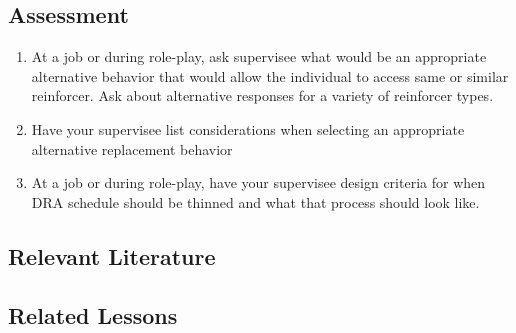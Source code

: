 \subsection{Assessment}
\begin{enumerate}
\item At a job or during role-play, ask supervisee what would be an appropriate alternative behavior that would allow the individual to access same or similar reinforcer. Ask about alternative responses for a variety of reinforcer types.
\item Have your supervisee list considerations when selecting an appropriate alternative replacement behavior
\item At a job or during role-play, have your supervisee design criteria for when DRA schedule should be thinned and what that process should look like.
%
\end{enumerate}
%
\subsection{Relevant Literature}
\begin{refsection}
\nocite{athens2010investigation,
        cooper2007applied,
        sweeney2013effects,
        vollmer1999evaluating}
\printbibliography[heading=none]
\end{refsection}
%
\subsection{Related Lessons}
\fourdTwo{}\\
\fourdEighteen{}\\
\fourdNineteen{}\\
\fouriSix{}\\
\fourjSix{}\\
\fourjSeven{}\\
